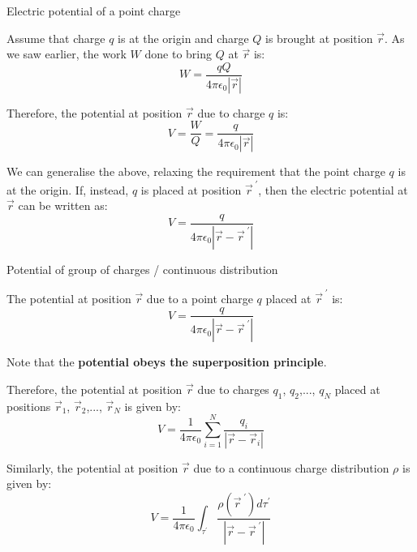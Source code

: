 %
%
%

\begin{frame}{Electric potential of a point charge}

Assume that charge $q$ is at the origin and charge
$Q$ is brought at position $\vec{r}$.
As we saw earlier, the work $W$ done to bring $Q$ at $\vec{r}$ is:
\begin{equation*}
   W = \frac{q Q}{4\pi\epsilon_0 |\vec{r}|}
\end{equation*}

Therefore, the potential at position $\vec{r}$ due to charge $q$ is:
\begin{equation*}
   V = \frac{W}{Q} = \frac{q}{4\pi\epsilon_0 |\vec{r}|}
\end{equation*}

We can generalise the above, relaxing the requirement that the point charge
$q$ is at the origin. If, instead, $q$ is placed at position $\vec{r}^{\;\prime}$,
then the electric potential at $\vec{r}$ can be written as:
\begin{equation*}
   V = \frac{q}{4\pi\epsilon_0 |\vec{r}-\vec{r}^{\;\prime}|}
\end{equation*}

\end{frame}

%
%
%

\begin{frame}{Potential of group of charges / continuous distribution}

The potential at position $\vec{r}$
due to a point charge $q$ placed at $\vec{r}^{\;\prime}$ is:
\begin{equation*}
   V = \frac{q}{4\pi\epsilon_0 |\vec{r}-\vec{r}^{\;\prime}|}
\end{equation*}

\vspace{0.2cm}

Note that the {\bf potential obeys the superposition principle}.\\
\vspace{0.2cm}

Therefore, the potential at position $\vec{r}$
due to charges $q_1$, $q_2$,..., $q_N$ placed at
positions $\vec{r}_1$, $\vec{r}_2$,..., $\vec{r}_N$ is given by:
\begin{equation*}
   V = \frac{1}{4\pi\epsilon_0}
   \sum_{i=1}^{N} \frac{q_i}{|\vec{r}-\vec{r}_{i}|}
\end{equation*}

Similarly, the potential at position $\vec{r}$
due to a continuous charge distribution $\rho$ is given by:
\begin{equation*}
   V = \frac{1}{4\pi\epsilon_0}
     \int_{\tau^\prime} \frac{\rho(\vec{r}^{\;\prime})d\tau^\prime}{|\vec{r}-\vec{r}^{\;\prime}|}
\end{equation*}

\end{frame}


